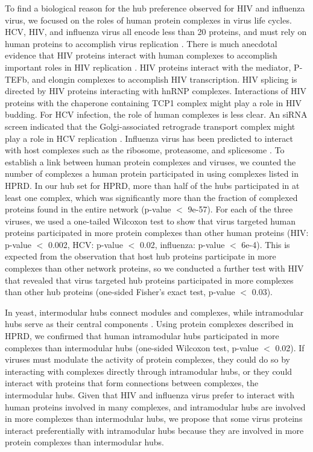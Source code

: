 To find a biological reason for the hub preference observed for HIV
and influenza virus, we focused on the roles of human protein
complexes in virus life cycles. HCV, HIV, and influenza virus all
encode less than 20 proteins, and must rely on human proteins to
accomplish virus replication \cite{Li09,tastan09}. There is much
anecdotal evidence that HIV proteins interact with human complexes to
accomplish important roles in HIV replication \cite{bushman09}. HIV
proteins interact with the mediator, P-TEFb, and elongin complexes to
accomplish HIV transcription. HIV splicing is directed by HIV proteins
interacting with hnRNP complexes. Interactions of HIV proteins with
the chaperone containing TCP1 complex might play a role in HIV
budding. For HCV infection, the role of human complexes is less
clear. An siRNA screen indicated that the Golgi-associated retrograde
transport complex might play a role in HCV replication
\cite{Li09}. Influenza virus has been predicted to interact with host
complexes such as the ribosome, proteasome, and splicesome
\cite{konig2009human}. To establish a link between human protein
complexes and viruses, we counted the number of complexes a human
protein participated in using complexes listed in HPRD. In our hub set
for HPRD, more than half of the hubs participated in at least one
complex, which was significantly more than the fraction of complexed
proteins found in the entire network (p-value $<$ 9e-57). For each of
the three viruses, we used a one-tailed Wilcoxon test to show that
virus targeted human proteins participated in more protein complexes
than other human proteins (HIV: p-value $<$ 0.002, HCV: p-value $<$
0.02, influenza: p-value $<$ 6e-4). This is expected from the
observation that host hub proteins participate in more complexes than
other network proteins, so we conducted a further test with HIV that
revealed that virus targeted hub proteins participated in more
complexes than other hub proteins (one-sided Fisher's exact test,
p-value $<$ 0.03).

In yeast, intermodular hubs connect modules and complexes, while
intramodular hubs serve as their central components
\cite{fraser05}. Using protein complexes described in HPRD, we
confirmed that human intramodular hubs participated in more complexes
than intermodular hubs (one-sided Wilcoxon test, p-value $<$ 0.02). If
viruses must modulate the activity of protein complexes, they could do
so by interacting with complexes directly through intramodular hubs,
or they could interact with proteins that form connections between
complexes, the intermodular hubs. Given that HIV and influenza virus
prefer to interact with human proteins involved in many complexes, and
intramodular hubs are involved in more complexes than intermodular
hubs, we propose that some virus proteins interact preferentially with
intramodular hubs because they are involved in more protein complexes
than intermodular hubs.

